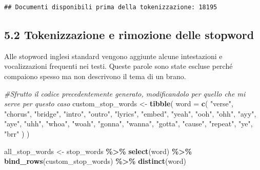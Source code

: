 \documentclass[
]{article}
\newenvironment{Shaded}{\begin{snugshade}}{\end{snugshade}}
\newcommand{\AttributeTok}[1]{\textcolor[rgb]{0.13,0.29,0.53}{#1}}
\newcommand{\CommentTok}[1]{\textcolor[rgb]{0.56,0.35,0.01}{\textit{#1}}}
\newcommand{\FunctionTok}[1]{\textcolor[rgb]{0.13,0.29,0.53}{\textbf{#1}}}
\newcommand{\NormalTok}[1]{#1}
\newcommand{\OtherTok}[1]{\textcolor[rgb]{0.56,0.35,0.01}{#1}}
\newcommand{\SpecialCharTok}[1]{\textcolor[rgb]{0.81,0.36,0.00}{\textbf{#1}}}
\newcommand{\StringTok}[1]{\textcolor[rgb]{0.31,0.60,0.02}{#1}}
\begin{document}
\begin{verbatim}
## Documenti disponibili prima della tokenizzazione: 18195
\end{verbatim}

\subsection{5.2 Tokenizzazione e rimozione delle
stopword}\label{tokenizzazione-e-rimozione-delle-stopword}

Alle stopword inglesi standard vengono aggiunte alcune intestazioni e
vocalizzazioni frequenti nei testi. Queste parole sono state escluse
perché compaiono spesso ma non descrivono il tema di un brano.

\begin{Shaded}
\begin{Highlighting}[]
\CommentTok{\#Sfrutto il codice precedentemente generato, modificandolo per quello che mi serve per questo caso}
\NormalTok{custom\_stop\_words }\OtherTok{\textless{}{-}} \FunctionTok{tibble}\NormalTok{(}
  \AttributeTok{word =} \FunctionTok{c}\NormalTok{(}
    \StringTok{"verse"}\NormalTok{,}
    \StringTok{"chorus"}\NormalTok{,}
    \StringTok{"bridge"}\NormalTok{,}
    \StringTok{"intro"}\NormalTok{,}
    \StringTok{"outro"}\NormalTok{,}
    \StringTok{"lyrics"}\NormalTok{,}
    \StringTok{"embed"}\NormalTok{,}
    \StringTok{"yeah"}\NormalTok{,}
    \StringTok{"ooh"}\NormalTok{,}
    \StringTok{"ohh"}\NormalTok{,}
    \StringTok{"ayy"}\NormalTok{,}
    \StringTok{"aye"}\NormalTok{,}
    \StringTok{"uhh"}\NormalTok{,}
    \StringTok{"whoa"}\NormalTok{,}
    \StringTok{"woah"}\NormalTok{,}
    \StringTok{"gonna"}\NormalTok{,}
    \StringTok{"wanna"}\NormalTok{,}
    \StringTok{"gotta"}\NormalTok{,}
    \StringTok{"cause"}\NormalTok{,}
    \StringTok{"repeat"}\NormalTok{,}
    \StringTok{"ye"}\NormalTok{,}
    \StringTok{"brr"}
\NormalTok{  )}
\NormalTok{)}

\NormalTok{all\_stop\_words }\OtherTok{\textless{}{-}}\NormalTok{ stop\_words }\SpecialCharTok{\%\textgreater{}\%}
  \FunctionTok{select}\NormalTok{(word) }\SpecialCharTok{\%\textgreater{}\%}
  \FunctionTok{bind\_rows}\NormalTok{(custom\_stop\_words) }\SpecialCharTok{\%\textgreater{}\%}
  \FunctionTok{distinct}\NormalTok{(word)}


\end{Highlighting}
\end{Shaded}
\end{document}
